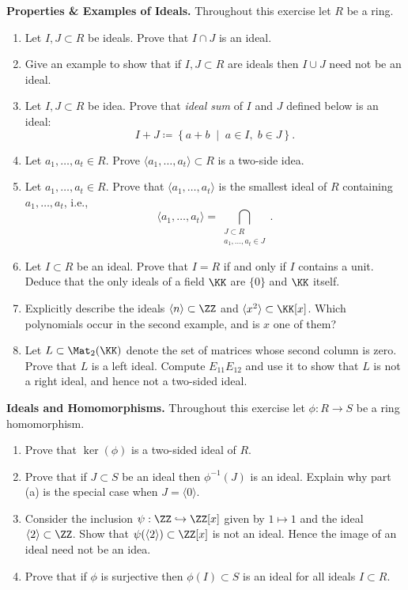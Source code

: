 \documentclass[12pt,reqno]{amsart}
\begin{document}
 \begin{problems}
\item\label{r:ideals} \textbf{Properties \& Examples  of Ideals.} Throughout this exercise let $R$ be a ring.
\begin{enumerate}
\item Let $I, J \subset R$ be ideals. Prove that $I\cap J$ is an ideal.
\item Give an example to show that if $I,J \subset R$ are ideals then $I\cup J$ need not be an ideal.
\item Let $I, J \subset R$ be idea. Prove that \emph{ideal sum} of $I$ and $J$ defined below is an ideal:
\[
I+J \coloneqq \left\{ a+b \;\; \big| \;\; a\in I, \; b\in J\right\}.
\]
\item Let $a_1,\ldots,a_t \in R$. Prove $\langle a_1,\ldots,a_t\rangle \subset R$ is a two-side idea.
\item Let $a_1,\ldots,a_t \in R$. Prove that $\langle a_1,\ldots,a_t\rangle$ is the smallest ideal of $R$ containing $a_1,\ldots,a_t$, i.e., 
\[
\langle a_1,\ldots,a_t\rangle = \bigcap_{\substack{J \subset R \\ a_1,\ldots,a_t \in J}}.
\]
\item Let $I \subset R$ be an ideal. Prove that $I=R$ if and only if $I$ contains a unit. Deduce that the only ideals of a field $\KK$ are $\{0\}$ and $\KK$ itself.

\item Explicitly describe the ideals $\langle n\rangle \subset \ZZ$ and $\langle x^2\rangle\subset \KK[x]$. Which polynomials occur in the second example, and is $x$ one of them?

\item Let $L\subset \Mat_2(\KK)$ denote the set of matrices whose second column is zero. Prove that $L$ is a left ideal. Compute $E_{11}E_{12}$ and use it to show that $L$ is not a right ideal, and hence not a two-sided ideal.
\end{enumerate}
\end{problems}

\begin{problems}
\item\label{r:iceal-homs} \textbf{Ideals and Homomorphisms.} Throughout this exercise let $\phi:R\to S$ be a ring homomorphism. 
\begin{enumerate}
\item Prove that $\ker(\phi)$ is a two-sided ideal of $R$.  
\item Prove that if $J\subset S$ be an ideal then $\phi^{-1}(J)$ is an ideal. Explain why part (a) is the special case when $J=\langle0\rangle$. 
\item Consider the inclusion $\psi:\ZZ \hookrightarrow\ZZ[x]$ given by $1\mapsto 1$ and the ideal $\langle 2 \rangle \subset \ZZ$. Show that $\psi(\langle 2 \rangle) \subset \ZZ[x]$ is not an ideal. Hence the image of an ideal need not be an idea. 
\item Prove that if $\phi$ is surjective then $\phi(I) \subset S$ is an ideal for all ideals $I \subset R$. 
\end{enumerate}
\end{problems}
 
\end{document}
